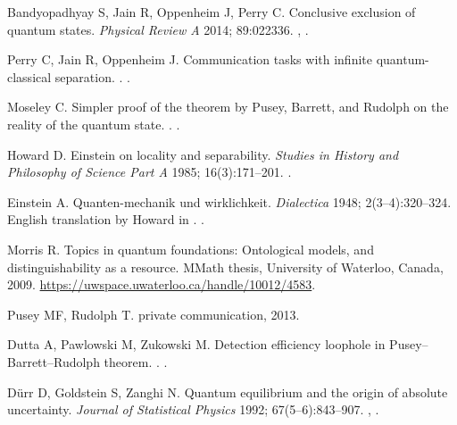 \documentclass[DIV=calc,fontsize=12pt]{scrartcl} %
\theoremstyle{definition}
\theoremstyle{plain}
\begin{document}
\begin{thebibliography}{999}
Bandyopadhyay S, Jain R, Oppenheim J, Perry C.
\newblock Conclusive exclusion of quantum states.
\newblock \emph{Physical Review A} 2014; 89:022336.
\newblock \href {http://arxiv.org/abs/1306.4683} {},
\href {http://dx.doi.org/10.1103/PhysRevA.89.022336}
{}.

Perry C, Jain R, Oppenheim J.
\newblock Communication tasks with infinite quantum-classical separation.
.
\newblock \href {http://arxiv.org/abs/1407.8217} {}.

Moseley C.
\newblock Simpler proof of the theorem by Pusey, Barrett, and Rudolph on
the reality of the quantum state.
.
\newblock \href {http://arxiv.org/abs/1401.0026} {}.

Howard D.
\newblock Einstein on locality and separability.
\newblock \emph{Studies in History and Philosophy of Science Part A} 1985; 16(3):171--201.
\newblock \href {http://dx.doi.org/10.1016/0039-3681(85)90001-9}
{}.

Einstein A.
\newblock Quanten-mechanik und wirklichkeit.
\newblock \emph{Dialectica} 1948; 2(3--4):320--324.
\newblock English translation by Howard in \cite{Howard1985}.
\newblock \href {http://dx.doi.org/10.1111/j.1746-8361.1948.tb00704.x}
{}.

Morris R.
\newblock Topics in quantum foundations: Ontological models, and
distinguishability as a resource.
\newblock MMath thesis, University of Waterloo, Canada, 2009.
\newblock \url{https://uwspace.uwaterloo.ca/handle/10012/4583}.

Pusey MF, Rudolph T.
\newblock private communication, 2013.

Dutta A, Pawlowski M, Zukowski M.
\newblock Detection efficiency loophole in Pusey--Barrett--Rudolph theorem.
.
\newblock \href {http://arxiv.org/abs/1407.5577} {}.

D{\"u}rr D, Goldstein S, Zanghi N.
\newblock Quantum equilibrium and the origin of absolute uncertainty.
\newblock \emph{Journal of Statistical Physics} 1992; 67(5--6):843--907.
\newblock \href {http://arxiv.org/abs/quant-ph/0308039}
{}, \href {http://dx.doi.org/10.1007/BF01049004}
{}.


\end{thebibliography}
\end{document}
